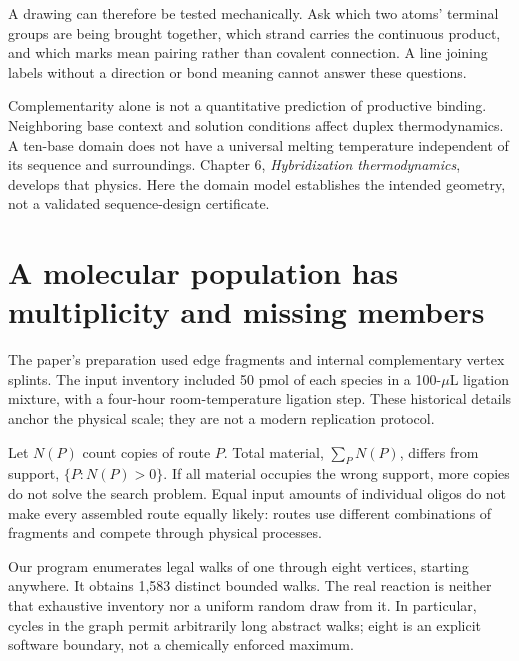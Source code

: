 A drawing can therefore be tested mechanically. Ask which two atoms' terminal groups are being brought together, which strand carries the continuous product, and which marks mean pairing rather than covalent connection. A line joining labels without a direction or bond meaning cannot answer these questions.

Complementarity alone is not a quantitative prediction of productive binding. Neighboring base context and solution conditions affect duplex thermodynamics.\cite{SantaLucia1998} A ten-base domain does not have a universal melting temperature independent of its sequence and surroundings. Chapter 6, \emph{Hybridization thermodynamics}, develops that physics. Here the domain model establishes the intended geometry, not a validated sequence-design certificate.

\section{A molecular population has multiplicity and missing members}
The paper's preparation used edge fragments and internal complementary vertex splints. The input inventory included 50 pmol of each species in a 100-$\mu$L ligation mixture, with a four-hour room-temperature ligation step.\cite{Adleman1994} These historical details anchor the physical scale; they are not a modern replication protocol.


Let $N(P)$ count copies of route $P$. Total material, $\sum_P N(P)$, differs from support, $\{P:N(P)>0\}$. If all material occupies the wrong support, more copies do not solve the search problem. Equal input amounts of individual oligos do not make every assembled route equally likely: routes use different combinations of fragments and compete through physical processes.

Our program enumerates legal walks of one through eight vertices, starting anywhere. It obtains 1,583 distinct bounded walks. The real reaction is neither that exhaustive inventory nor a uniform random draw from it. In particular, cycles in the graph permit arbitrarily long abstract walks; eight is an explicit software boundary, not a chemically enforced maximum.

